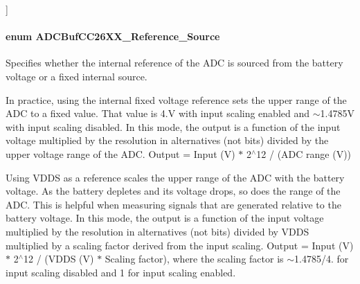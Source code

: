 \begin{Desc}
\begin{description}
{}]\item[{\em 
A\+D\+C\+Buf\+C\+C26\+X\+X\+\_\+\+S\+A\+M\+P\+L\+I\+N\+G\+\_\+\+D\+U\+R\+A\+T\+I\+O\+N\+\_\+10\+P9\+\_\+\+M\+S\label{_a_d_c_buf_c_c26_x_x_8h_a4a95bf383dea0206b6708496a034a9fbaf5746a2bb589e0fc237dfe7cea002859}
}]\end{description}
\end{Desc}
\paragraph[{A\+D\+C\+Buf\+C\+C26\+X\+X\+\_\+\+Reference\+\_\+\+Source}]{\setlength{\rightskip}{0pt plus 5cm}enum {\bf A\+D\+C\+Buf\+C\+C26\+X\+X\+\_\+\+Reference\+\_\+\+Source}}\label{_a_d_c_buf_c_c26_x_x_8h_a31a41d718712f3d4ff936bb566da0d0a}


Specifies whether the internal reference of the A\+D\+C is sourced from the battery voltage or a fixed internal source. 


\begin{DoxyItemize}
\item In practice, using the internal fixed voltage reference sets the upper range of the A\+D\+C to a fixed value. That value is 4.\+V with input scaling enabled and $\sim$1.4785\+V with input scaling disabled. In this mode, the output is a function of the input voltage multiplied by the resolution in alternatives (not bits) divided by the upper voltage range of the A\+D\+C. Output = Input (V) $\ast$ 2$^\wedge$12 / (A\+D\+C range (V))
\item Using V\+D\+D\+S as a reference scales the upper range of the A\+D\+C with the battery voltage. As the battery depletes and its voltage drops, so does the range of the A\+D\+C. This is helpful when measuring signals that are generated relative to the battery voltage. In this mode, the output is a function of the input voltage multiplied by the resolution in alternatives (not bits) divided by V\+D\+D\+S multiplied by a scaling factor derived from the input scaling. Output = Input (V) $\ast$ 2$^\wedge$12 / (V\+D\+D\+S (V) $\ast$ Scaling factor), where the scaling factor is $\sim$1.4785/4. for input scaling disabled and 1 for input scaling enabled.
\end{DoxyItemize}

